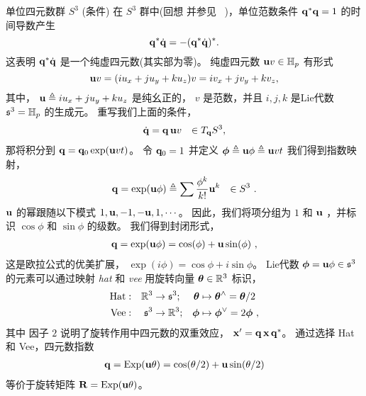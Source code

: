 
\begin{fexample}{单位四元数群 $S^3$ (条件)}
\label{ex:S3}
在 $S^3$ 群中(回想  并参见 \eg\ \cite{SOLA-17-Quaternion})，单位范数条件 ${\bf q}^*{\bf q}=1$ 的时间导数产生 
%
$${\bf q}^*\dot{{\bf q}}=-({\bf q}^*\dot{{\bf q}})^*
.
$$
%
这表明 ${\bf q}^*\dot{{\bf q}}$ 是一个纯虚四元数(其实部为零)。
纯虚四元数 ${\bf u} v\in{\mathbb H}_p$ 有形式 
%
$${\bf u} v=(iu_x+ju_y+ku_z)v =iv_x+jv_y+kv_z 
,$$
%
其中， ${\bf u}\triangleq iu_x+ju_y+ku_z$ 是纯幺正的， $v$ 是范数，并且 $i,j,k$ 是Lie代数 $\frak{s}^3={\mathbb H}_p$ 的生成元。
%
重写我们上面的条件，
%
\begin{align*}
\dot{{\bf q}}={\bf q}\, {\bf u} v &&\in T_{{\bf q}}{S^3}
,
\end{align*}
% 
那将积分到 ${\bf q} = {\bf q}_0\exp({\bf u} v t)$。 
令 ${\bf q}_0=1$ 并定义 ${{\bm \phi}} \triangleq {\bf u}\phi \triangleq{\bf u} v t$ 我们得到指数映射，
%
\begin{align*}
{\bf q} = \exp({\bf u}\phi) \triangleq \sum \frac{\phi^k}{k!}{\bf u}^k &&\in S^3
~.
\end{align*}
%
${\bf u}$ 的幂跟随以下模式 $1,{\bf u},-1,-{\bf u},1,\cdots$。
因此，我们将项分组为 $1$ 和 ${\bf u}$ ，并标识 $\cos\phi$ 和 $\sin\phi$ 的级数。
我们得到封闭形式，
%
\begin{align*}
{\bf q} = \exp({\bf u}\phi) = \cos(\phi) + {\bf u}\sin(\phi) 
~,
\end{align*}
%
这是欧拉公式的优美扩展， $\exp(i\phi)=\cos\phi+i\sin\phi$。
%
Lie代数 ${\bm \phi}={\bf u} \phi\in\frak{s}^3$ 的元素可以通过映射 \emph{hat} 和 \emph{vee} 用旋转向量 ${{\bm \theta}}\in{\mathbb R}^3$ 标识，
%
\begin{align*}
\textrm{Hat}&:& {\mathbb R}^3&\to\frak{s}^3;& {{\bm \theta}}&\mapsto{{\bm \theta}}^\wedge={{\bm \theta}}/2
\\
\textrm{Vee}&:& \frak{s}^3&\to{\mathbb R}^3;& {{\bm \phi}}&\mapsto{{\bm \phi}}^\vee=2{{\bm \phi}}
~,
\end{align*}
%
其中 %
因子 $2$ 说明了旋转作用中四元数的双重效应， ${\bf x}'={\bf q}\,{\bf x}\,{\bf q}^*$。 
%
通过选择 Hat 和 Vee，四元数指数
%
\begin{align*}
{\bf q} = \operatorname*{Exp}({\bf u}\theta)=\cos(\theta/2)+{\bf u}\sin(\theta/2)
\end{align*}
%
等价于旋转矩阵 ${\bf R}=\operatorname*{Exp}({\bf u}\theta)$。
\end{fexample}
